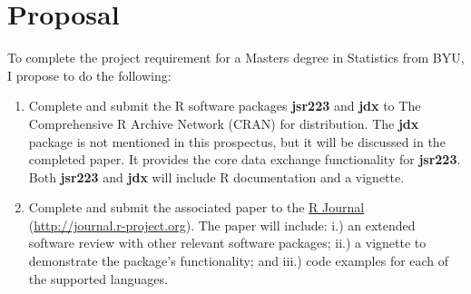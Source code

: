 
\chapter{Proposal}

To complete the project requirement for a Masters degree in Statistics from BYU, I propose to do the following:

\begin{enumerate}
\item Complete and submit the R software packages \textbf{jsr223} and \textbf{jdx} to The Comprehensive R Archive Network (CRAN) for distribution. The \textbf{jdx} package is not mentioned in this prospectus, but it will be discussed in the completed paper. It provides the core data exchange functionality for \textbf{jsr223}. Both \textbf{jsr223} and \textbf{jdx} will include R documentation and a vignette.

\item Complete and submit the associated paper to the \href{http://journal.r-project.org}{R Journal} \\ (\href{http://journal.r-project.org}{http://journal.r-project.org}). The paper will include: i.) an extended software review with other relevant software packages; ii.) a vignette to demonstrate the package's functionality; and iii.) code examples for each of the supported languages.
\end{enumerate}
